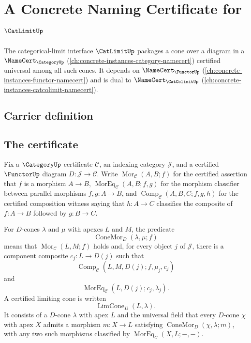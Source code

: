 \chapter{A Concrete Naming Certificate for $\CatLimitUp$}
\label{ch:concrete-instances-catlimit-namecert}

The categorical-limit interface $\CatLimitUp$ packages a cone over a diagram in a $\NameCert_{\CategoryUp}$ (\autoref{ch:concrete-instances-category-namecert}) certified universal among all such cones. It depends on $\NameCert_{\FunctorUp}$ (\autoref{ch:concrete-instances-functor-namecert}) and is dual to $\NameCert_{\CatColimitUp}$ (\autoref{ch:concrete-instances-catcolimit-namecert}).

\section{Carrier definition}
\label{sec:catlimit-carrier}

\section{The certificate}
\label{sec:catlimit-certificate}

\begin{definition}\label{def:catlimit-fixed-diagram-comparison-data}
Fix a $\CategoryUp$ certificate $\mathcal C$, an indexing category $\mathcal J$, and a certified $\FunctorUp$ diagram $D:\mathcal J\to\mathcal C$. Write $\operatorname{Mor}_{\mathcal C}(A,B;f)$ for the certified assertion that $f$ is a morphism $A\to B$, $\operatorname{MorEq}_{\mathcal C}(A,B;f,g)$ for the morphism classifier between parallel morphisms $f,g:A\to B$, and $\operatorname{Comp}_{\mathcal C}(A,B,C;f,g,h)$ for the certified composition witness saying that $h:A\to C$ classifies the composite of $f:A\to B$ followed by $g:B\to C$.

For $D$-cones $\lambda$ and $\mu$ with apexes $L$ and $M$, the predicate
$$\operatorname{ConeMor}_{D}(\lambda,\mu;f)$$
means that $\operatorname{Mor}_{\mathcal C}(L,M;f)$ holds and, for every object $j$ of $\mathcal J$, there is a component composite $c_j:L\to D(j)$ such that
$$\operatorname{Comp}_{\mathcal C}(L,M,D(j);f,\mu_j,c_j)$$
and
$$\operatorname{MorEq}_{\mathcal C}(L,D(j);c_j,\lambda_j).$$
A certified limiting cone is written
$$\operatorname{LimCone}_{D}(L,\lambda).$$
It consists of a $D$-cone $\lambda$ with apex $L$ and the universal field that every $D$-cone $\chi$ with apex $X$ admits a morphism $m:X\to L$ satisfying $\operatorname{ConeMor}_{D}(\chi,\lambda;m)$, with any two such morphisms classified by $\operatorname{MorEq}_{\mathcal C}(X,L;-,-)$.
\end{definition}

